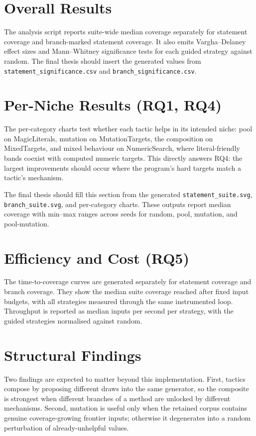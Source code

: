 \documentclass[11pt,a4paper]{report}
\begin{document}
\section{Overall Results}
\label{sec:overall}

The analysis script reports suite-wide median coverage separately for statement coverage and branch-marked
statement coverage. It also emits Vargha--Delaney effect sizes and Mann--Whitney significance tests for each
guided strategy against random. The final thesis should insert the generated values from
\texttt{statement\_significance.csv} and \texttt{branch\_significance.csv}.

\section{Per-Niche Results (RQ1, RQ4)}
\label{sec:niches}

The per-category charts test whether each tactic helps in its intended niche: pool on MagicLiterals,
mutation on MutationTargets, the composition on MixedTargets, and mixed behaviour on NumericSearch, where
literal-friendly bands coexist with computed numeric targets. This directly answers RQ4: the largest improvements should occur where the program's hard
targets match a tactic's mechanism.

The final thesis should fill this section from the generated
\texttt{statement\_suite.svg}, \texttt{branch\_suite.svg}, and per-category
charts. These outputs report median coverage with min--max ranges across seeds
for random, pool, mutation, and pool-mutation.

\section{Efficiency and Cost (RQ5)}
\label{sec:cost}

The time-to-coverage curves are generated separately for statement coverage and branch coverage. They show
the median suite coverage reached after fixed input budgets, with all strategies measured through the same
instrumented loop. Throughput is reported as median inputs per second per strategy, with the guided strategies
normalised against random.

\section{Structural Findings}
\label{sec:findings}

Two findings are expected to matter beyond this implementation. First, tactics compose by proposing different
draws into the same generator, so the composite is strongest when different branches of a method are unlocked
by different mechanisms. Second, mutation is useful only when the retained corpus contains genuine
coverage-growing frontier inputs; otherwise it degenerates into a random perturbation of already-unhelpful
values.
\end{document}
